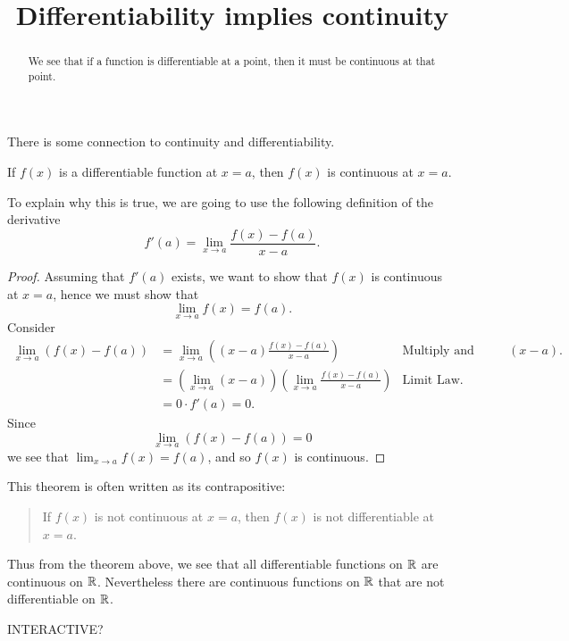 \documentclass{ximera}
\title[Dig-In:]{Differentiability implies continuity}
\begin{document}
\begin{abstract}
We see that if a function is differentiable at a point, then it must
be continuous at that point.
\end{abstract}
\maketitle

There is some connection to continuity and differentiability.

\begin{theorem}
If $f(x)$ is a differentiable function at $x = a$, then $f(x)$ is
continuous at $x=a$.
\end{theorem}

To explain why this is true, we are going to use the following
definition of the derivative
\[
f'(a) = \lim_{x\to a} \frac{f(x)-f(a)}{x-a}.
\]
\begin{proof}
Assuming that $f'(a)$ exists, we want to show that $f(x)$ is
continuous at $x=a$, hence we must show that
\[
\lim_{x\to a} f(x) = f(a).
\]
Consider
\begin{align*}
\lim_{x\to a} \left(f(x) - f(a)\right) &= \lim_{x\to a} \left((x-a)\frac{f(x) - f(a)}{x-a}\right) &\text{Multiply and divide by $(x-a)$.} \\
&= \left(\lim_{x\to a} (x-a) \right) \left(\lim_{x\to a}\frac{f(x) - f(a)}{x-a}\right) &\text{Limit Law.} \\
&= 0\cdot f'(a) = 0.
\end{align*}
Since 
\[
\lim_{x\to a}\left(f(x) - f(a)\right) = 0 
\]
we see that $\lim_{x\to a} f(x) = f(a)$, and so $f(x)$ is continuous.
\end{proof}

This theorem is often written as its contrapositive:
\begin{quote}
If $f(x)$ is not continuous at $x=a$, then $f(x)$ is not
differentiable at $x=a$.
\end{quote}


Thus from the theorem above, we see that all differentiable functions
on $\mathbb R$ are continuous on $\mathbb R$. Nevertheless there are continuous
functions on $\mathbb R$ that are not differentiable on $\mathbb R$.

INTERACTIVE?
\end{document}
